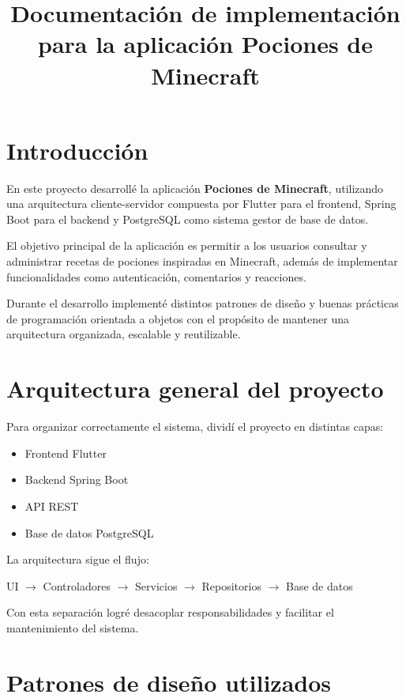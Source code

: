 \documentclass[12pt,a4paper]{article}
\title{
    \textbf{Documentación de implementación para la aplicación Pociones de Minecraft}
}
\author{}
\date{}
\begin{document}
\maketitle

\tableofcontents

\newpage

\section{Introducción}

En este proyecto desarrollé la aplicación \textbf{Pociones de Minecraft}, utilizando una arquitectura cliente-servidor compuesta por Flutter para el frontend, Spring Boot para el backend y PostgreSQL como sistema gestor de base de datos.

El objetivo principal de la aplicación es permitir a los usuarios consultar y administrar recetas de pociones inspiradas en Minecraft, además de implementar funcionalidades como autenticación, comentarios y reacciones.

Durante el desarrollo implementé distintos patrones de diseño y buenas prácticas de programación orientada a objetos con el propósito de mantener una arquitectura organizada, escalable y reutilizable.

\section{Arquitectura general del proyecto}

Para organizar correctamente el sistema, dividí el proyecto en distintas capas:

\begin{itemize}
    \item Frontend Flutter
    \item Backend Spring Boot
    \item API REST
    \item Base de datos PostgreSQL
\end{itemize}

La arquitectura sigue el flujo:

\begin{center}
UI $\rightarrow$ Controladores $\rightarrow$ Servicios $\rightarrow$ Repositorios $\rightarrow$ Base de datos
\end{center}

Con esta separación logré desacoplar responsabilidades y facilitar el mantenimiento del sistema.

\section{Patrones de diseño utilizados}
\end{document}
